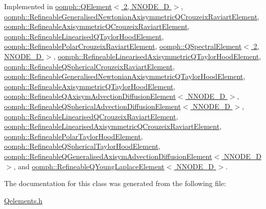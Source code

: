 Implemented in \hyperlink{classoomph_1_1QElement_3_012_00_01NNODE__1D_01_4_a9d25598f1028fbd881dd5c57fea03d83}{oomph\+::\+Q\+Element$<$ 2, N\+N\+O\+D\+E\+\_\+D $>$}, \hyperlink{classoomph_1_1RefineableGeneralisedNewtonianAxisymmetricQCrouzeixRaviartElement_ab40a282339a7f9238f88de7f88654f15}{oomph\+::\+Refineable\+Generalised\+Newtonian\+Axisymmetric\+Q\+Crouzeix\+Raviart\+Element}, \hyperlink{classoomph_1_1RefineableAxisymmetricQCrouzeixRaviartElement_a9d6988c1e72c26c9279dad476eb5cdde}{oomph\+::\+Refineable\+Axisymmetric\+Q\+Crouzeix\+Raviart\+Element}, \hyperlink{classoomph_1_1RefineableLinearisedQTaylorHoodElement_afe6944d2b619253c840a326460f32eaa}{oomph\+::\+Refineable\+Linearised\+Q\+Taylor\+Hood\+Element}, \hyperlink{classoomph_1_1RefineablePolarCrouzeixRaviartElement_a1de048c6cb46845803026af04082457a}{oomph\+::\+Refineable\+Polar\+Crouzeix\+Raviart\+Element}, \hyperlink{classoomph_1_1QSpectralElement_3_012_00_01NNODE__1D_01_4_a7baa82a39e2593e5e3505c0ce1dd116b}{oomph\+::\+Q\+Spectral\+Element$<$ 2, N\+N\+O\+D\+E\+\_\+D $>$}, \hyperlink{classoomph_1_1RefineableLinearisedAxisymmetricQTaylorHoodElement_a33924a0fb1d9620734a845545b27c7be}{oomph\+::\+Refineable\+Linearised\+Axisymmetric\+Q\+Taylor\+Hood\+Element}, \hyperlink{classoomph_1_1RefineableQSphericalCrouzeixRaviartElement_ac75e04db8f4da1e84990a2b22c8b19fb}{oomph\+::\+Refineable\+Q\+Spherical\+Crouzeix\+Raviart\+Element}, \hyperlink{classoomph_1_1RefineableGeneralisedNewtonianAxisymmetricQTaylorHoodElement_a8cf45d940ce7566f21df30d8e875fd65}{oomph\+::\+Refineable\+Generalised\+Newtonian\+Axisymmetric\+Q\+Taylor\+Hood\+Element}, \hyperlink{classoomph_1_1RefineableAxisymmetricQTaylorHoodElement_a1ab3ad8214ed275ea748d6a37fde086d}{oomph\+::\+Refineable\+Axisymmetric\+Q\+Taylor\+Hood\+Element}, \hyperlink{classoomph_1_1RefineableQAxisymAdvectionDiffusionElement_ae9d0316ec7fa1f54500e067852e4c259}{oomph\+::\+Refineable\+Q\+Axisym\+Advection\+Diffusion\+Element$<$ N\+N\+O\+D\+E\+\_\+D $>$}, \hyperlink{classoomph_1_1RefineableQSphericalAdvectionDiffusionElement_af835676dba7c709266afe91006465b97}{oomph\+::\+Refineable\+Q\+Spherical\+Advection\+Diffusion\+Element$<$ N\+N\+O\+D\+E\+\_\+D $>$}, \hyperlink{classoomph_1_1RefineableLinearisedQCrouzeixRaviartElement_afa7b775f1f2a47c3c28fa61b77a34e4d}{oomph\+::\+Refineable\+Linearised\+Q\+Crouzeix\+Raviart\+Element}, \hyperlink{classoomph_1_1RefineableLinearisedAxisymmetricQCrouzeixRaviartElement_ad04e4eabf235314ccea7b856cb4e3ef6}{oomph\+::\+Refineable\+Linearised\+Axisymmetric\+Q\+Crouzeix\+Raviart\+Element}, \hyperlink{classoomph_1_1RefineablePolarTaylorHoodElement_aa484bc80b8f15cd952d837c762700fd8}{oomph\+::\+Refineable\+Polar\+Taylor\+Hood\+Element}, \hyperlink{classoomph_1_1RefineableQSphericalTaylorHoodElement_a9075467fb311c04ce1dfec15946e7162}{oomph\+::\+Refineable\+Q\+Spherical\+Taylor\+Hood\+Element}, \hyperlink{classoomph_1_1RefineableQGeneralisedAxisymAdvectionDiffusionElement_a481456d85d19abedca780110a51032e0}{oomph\+::\+Refineable\+Q\+Generalised\+Axisym\+Advection\+Diffusion\+Element$<$ N\+N\+O\+D\+E\+\_\+D $>$}, and \hyperlink{classoomph_1_1RefineableQYoungLaplaceElement_ad13e8cb5cdf4ddf4451f6c0ec06d56fe}{oomph\+::\+Refineable\+Q\+Young\+Laplace\+Element$<$ N\+N\+O\+D\+E\+\_\+D $>$}.



The documentation for this class was generated from the following file\+:\begin{DoxyCompactItemize}
\item 
\hyperlink{Qelements_8h}{Qelements.\+h}\end{DoxyCompactItemize}

